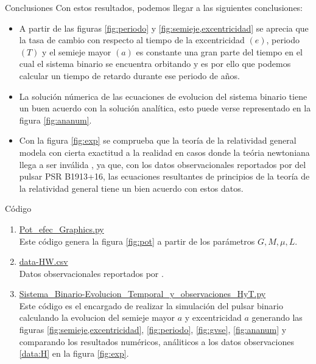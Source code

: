 \begin{frame}{Conclusiones}
    Con estos resultados, podemos llegar a las siguientes conclusiones:
\begin{itemize}
    \item A partir de las figuras \ref{fig:periodo} y \ref{fig:semieje,excentricidad} se aprecia que la tasa de cambio 
    con respecto al tiempo de la excentricidad $(e)$, periodo $(T)$ y el semieje mayor $(a)$ es constante una gran parte del 
    tiempo en el cual el sistema binario se encuentra orbitando y es por ello que podemos calcular un tiempo de retardo durante ese periodo de años.
    \item La solución númerica de las ecuaciones de evolucion del sistema binario tiene un buen acuerdo con la solución analítica, esto puede verse representado
    en la figura \ref{fig:ananum}.
    \item Con la figura \ref{fig:exp} se comprueba que la teoría de la relatividad general modela con cierta exactitud a la realidad en casos donde la teória newtoniana llega a ser inválida
    , ya que, con los datos observacionales reportados por \cite{Weisberg2010} del pulsar PSR B1913+16, las ecuaciones resultantes de principios de la teoría de la relatividad general tiene un bien acuerdo con estos datos.
\end{itemize}
\end{frame}
\begin{frame}{Código}
    \begin{enumerate}
        \item \href{https://github.com/giovannilopez9808/Notas_Agosto_2020/blob/master/RG/Proyecto_final/Documento/Scripts/Pot_efec_Graphics.py}{Pot\_efec\_Graphics.py\label{cod:potefe}}\\
        Este código genera la figura \ref{fig:pot} a partir de los parámetros $G,M,\mu,L$.
        \item \href{https://github.com/giovannilopez9808/Notas_Agosto_2020/blob/master/RG/Proyecto_final/Documento/Scripts/data-HW.csv}{data-HW.csv\label{data:H}}\\
        Datos observacionales reportados por \cite{Weisberg2010}.
        \item \href{https://github.com/giovannilopez9808/Notas_Agosto_2020/blob/master/RG/Proyecto_final/Documento/Scripts/Sistema_Binario-Evolucion_Temporal_y_observaciones_HyT.py}{Sistema\_Binario-Evolucion\_Temporal\_y\_observaciones\_HyT.py\label{cod:evo}}\\
        Este código es el encargado de realizar la simulación del pulsar binario calculando la evolucion del semieje mayor $a$ y excentricidad $a$ generando las figuras \ref{fig:semieje,excentricidad}, \ref{fig:periodo}, \ref{fig:gvse}, \ref{fig:ananum} y comparando los resultados numéricos, análiticos a los datos observaciones 
        \ref{data:H} en la figura \ref{fig:exp}.
    \end{enumerate}
\end{frame}